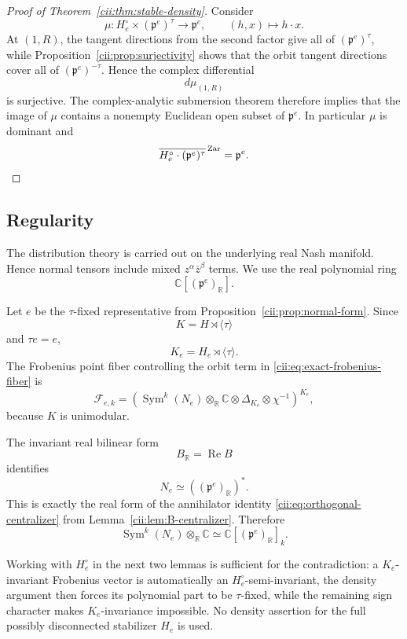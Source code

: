 \documentclass[10pt,a4paper]{amsart}
\numberwithin{equation}{section}
\newcommand{\C}{\mathbb C}
\newcommand{\R}{\mathbb R}
\newcommand{\Sym}{\operatorname{Sym}}
\begin{document}
\begin{proof}[Proof of Theorem~\ref{cii:thm:stable-density}]
Consider
\[
\mu:
H_e^\circ\times(\mathfrak p^e)^\tau
\longrightarrow
\mathfrak p^e,
\qquad
(h,x)\longmapsto h\cdot x.
\]
At \((1,R)\), the tangent directions from the second factor give all of
\((\mathfrak p^e)^\tau\), while
Proposition~\ref{cii:prop:surjectivity} shows that the orbit tangent directions
cover all of \((\mathfrak p^e)^{-\tau}\).  Hence the complex differential
\[
d\mu_{(1,R)}
\]
is surjective.  The complex-analytic submersion theorem therefore implies
that the image of \(\mu\) contains a nonempty Euclidean open subset of
\(\mathfrak p^e\).  In particular \(\mu\) is dominant and
\[
\overline{
H_e^\circ\cdot(\mathfrak p^e)^\tau
}^{\,\mathrm{Zar}}
=
\mathfrak p^e.\qedhere
\]
\end{proof}



\subsection{Regularity}\label{cii:sec:regularity}

The distribution theory is carried out on the underlying real Nash
manifold.  Hence normal tensors include mixed
\(z^\alpha\bar z^\beta\) terms.  We use the real polynomial ring
\[
\C[(\mathfrak p^e)_{\R}].
\]

Let \(e\) be the \(\tau\)-fixed representative from
Proposition~\ref{cii:prop:normal-form}.  Since
\[
K=H\rtimes\langle\tau\rangle
\]
and \(\tau e=e\),
\[
K_e=H_e\rtimes\langle\tau\rangle.
\]
The Frobenius point fiber controlling the orbit term in
\eqref{cii:eq:exact-frobenius-fiber} is
\begin{equation}\label{cii:eq:K-fiber}
\mathcal F_{e,k}
=
\left(
\Sym^k(N_e)\otimes_{\R}\C
\otimes\Delta_{K_e}
\otimes\chi^{-1}
\right)^{K_e},
\end{equation}
because \(K\) is unimodular.

The invariant real bilinear form
\[
  B_{\R}=\operatorname{Re}B
\]
identifies
\[
  N_e\simeq((\mathfrak p^e)_{\R})^*.
\]
This is exactly the real form of the annihilator identity
\eqref{cii:eq:orthogonal-centralizer} from
Lemma~\ref{cii:lem:B-centralizer}.
Therefore
\begin{equation}\label{cii:eq:real-poly}
\Sym^k(N_e)\otimes_{\R}\C
\simeq
\C[(\mathfrak p^e)_{\R}]_k.
\end{equation}

Working with $H_e^\circ$ in the next two lemmas is sufficient for the
contradiction: a $K_e$-invariant Frobenius vector is automatically an
$H_e^\circ$-semi-invariant, the density argument then forces its polynomial
part to be $\tau$-fixed, while the remaining sign character makes
$K_e$-invariance impossible.  No density assertion for the full possibly
disconnected stabilizer $H_e$ is used.
\end{document}
